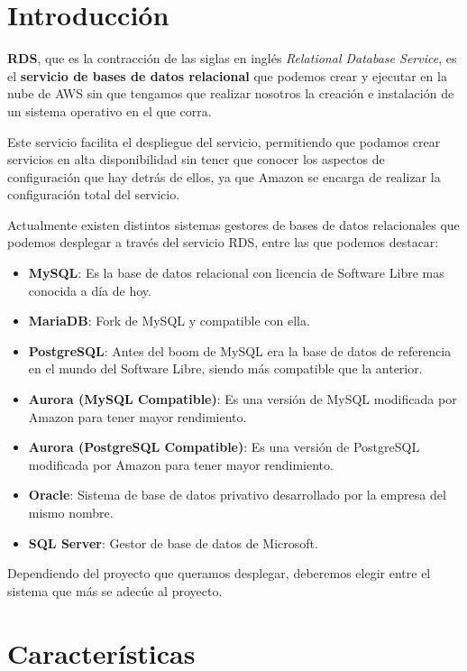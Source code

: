 \chapter{Introducción}

\textbf{RDS}, que es la contracción de las siglas en inglés \textit{Relational Database Service}, es el \textbf{servicio de bases de datos relacional} que podemos crear y ejecutar en la nube de AWS sin que tengamos que realizar nosotros la creación e instalación de un sistema operativo en el que corra.

Este servicio facilita el despliegue del servicio, permitiendo que podamos crear servicios en alta disponibilidad sin tener que conocer los aspectos de configuración que hay detrás de ellos, ya que Amazon se encarga de realizar la configuración total del servicio.

Actualmente existen distintos sistemas gestores de bases de datos relacionales que podemos desplegar a través del servicio RDS, entre las que podemos destacar:

\begin{itemize}
	\item \textbf{MySQL}: Es la base de datos relacional con licencia de Software Libre mas conocida a día de hoy.
	\item \textbf{MariaDB}: Fork de MySQL y compatible con ella.
	\item \textbf{PostgreSQL}: Antes del boom de MySQL era la base de datos de referencia en el mundo del Software Libre, siendo más compatible que la anterior.
	\item \textbf{Aurora (MySQL Compatible)}: Es una versión de MySQL modificada por Amazon para tener mayor rendimiento.
	\item \textbf{Aurora (PostgreSQL Compatible)}: Es una versión de PostgreSQL modificada por Amazon para tener mayor rendimiento.
	\item \textbf{Oracle}: Sistema de base de datos privativo desarrollado por la empresa del mismo nombre.
	\item \textbf{SQL Server}: Gestor de base de datos de Microsoft.
\end{itemize}

Dependiendo del proyecto que queramos desplegar, deberemos elegir entre el sistema que más se adecúe al proyecto.

\chapter{Características}

